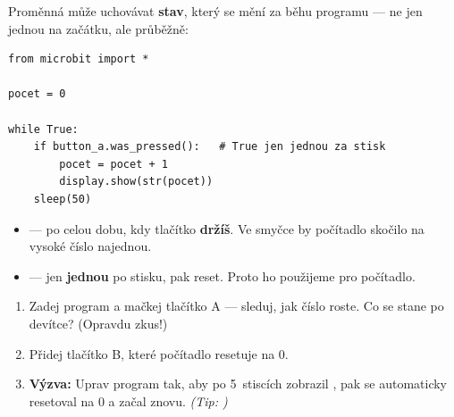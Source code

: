 \begin{bonusukol}

Proměnná může uchovávat \textbf{stav}, který se mění za běhu programu —
ne jen jednou na začátku, ale průběžně:

\begin{lstlisting}
from microbit import *

pocet = 0

while True:
    if button_a.was_pressed():   # True jen jednou za stisk
        pocet = pocet + 1
        display.show(str(pocet))
    sleep(50)
\end{lstlisting}

\begin{tcolorbox}[colback=code-bg, colframe=gray!40,
                  fonttitle=\small\bfseries, title=\texttt{is\_pressed()} vs \texttt{was\_pressed()}]
  \small
  \begin{itemize}[leftmargin=*]
    \item {} —  po celou dobu, kdy tlačítko \textbf{držíš}.
          Ve smyčce by počítadlo skočilo na vysoké číslo najednou.
    \item {} —  jen \textbf{jednou} po stisku, pak reset.
          Proto ho použijeme pro počítadlo.
  \end{itemize}
\end{tcolorbox}

\begin{enumerate}
  \item Zadej program a mačkej tlačítko A — sleduj, jak číslo roste.
        Co se stane po devítce? (Opravdu zkus!)
  \item Přidej tlačítko B, které počítadlo resetuje na 0.
  \item \textbf{Výzva:} Uprav program tak, aby po 5~stiscích zobrazil
        , pak se automaticky resetoval na 0
        a začal znovu.
        \textit{(Tip: )}
\end{enumerate}

\odpoved[3cm]

\end{bonusukol}


